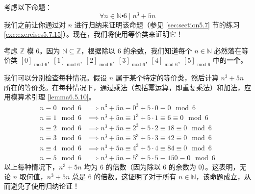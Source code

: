 \begin{example}
    考虑以下命题：
    \[\forall n \in \mathbb{N} \centerdot 6 \mid n^3 + 5n\]
    我们之前让你通过对 $n$ 进行归纳来证明该命题（参见 \ref{sec:section5.7} 节的练习 \ref{exc:exercises5.7.15}）。现在，我们将使用等价类来证明它！

    考虑 $\mathbb{Z}$ 模 $6$。因为 $\mathbb{N} \subseteq \mathbb{Z}$，根据除以 $6$ 的余数，我们知道每个 $n \in \mathbb{N}$ 必然落在等价类 $[0]_{\text{\ mod\ } 6}, \;[1]_{\text{\ mod\ } 6}, \;[2]_{\text{\ mod\ } 6}, \;[3]_{\text{\ mod\ } 6}, \;[4]_{\text{\ mod\ } 6}, \;[5]_{\text{\ mod\ } 6}$ 中的\textbf{一个}。

    我们可以分别检查每种情况。假设 $n$ 属于某个特定的等价类，然后计算 $n^3 + 5n$ 所在的等价类。在每种情况下，通过乘法（包括幂运算，即重复乘法）和加法，应用模算术引理 \ref{lemma6.5.10}。
    \begin{align*}
        n \equiv 0 \mod 6 &\implies n^3 + 5n \equiv 0^3 + 5 \cdot 0 \equiv 0 \mod 6 \\
        n \equiv 1 \mod 6 &\implies n^3 + 5n \equiv 1^3 + 5 \cdot 1 \equiv 6 \equiv 0 \mod 6 \\
        n \equiv 2 \mod 6 &\implies n^3 + 5n \equiv 2^3 + 5 \cdot 2 \equiv 18 \equiv 0 \mod 6 \\
        n \equiv 3 \mod 6 &\implies n^3 + 5n \equiv 3^3 + 5 \cdot 3 \equiv 42 \equiv 0 \mod 6 \\
        n \equiv 4 \mod 6 &\implies n^3 + 5n \equiv 4^3 + 5 \cdot 4 \equiv 84 \equiv 0 \mod 6 \\
        n \equiv 5 \mod 6 &\implies n^3 + 5n \equiv 5^3 + 5 \cdot 5 \equiv 150 \equiv 0 \mod 6 
    \end{align*}
    以上每种情况下，$n^3 + 5n$ 均为 $6$ 的倍数（因为除以 $6$ 的余数为 $0$）。这表明，无论 $n$ 取何值，$n^3 + 5n$ 总是 $6$ 的倍数。这证明了对于所有 $n \in \mathbb{N}$，该命题成立，从而避免了使用归纳论证！
\end{example}


